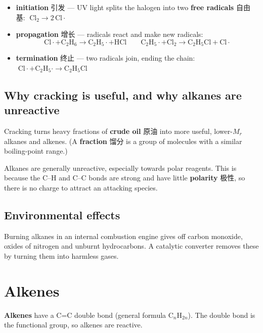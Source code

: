 \documentclass[11pt]{article}
\begin{document}
\begin{itemize}
\item \textbf{initiation} 引发 — UV light splits the halogen into two \textbf{free radicals} 自由基: $\;\text{Cl}_2 \rightarrow 2\,\text{Cl}\cdot$

\item \textbf{propagation} 增长 — radicals react and make new radicals: \[\text{Cl}\cdot + \text{C}_2\text{H}_6 \rightarrow \text{C}_2\text{H}_5\cdot + \text{HCl} \qquad \text{C}_2\text{H}_5\cdot + \text{Cl}_2 \rightarrow \text{C}_2\text{H}_5\text{Cl} + \text{Cl}\cdot\]

\item \textbf{termination} 终止 — two radicals join, ending the chain: $\;\text{Cl}\cdot + \text{C}_2\text{H}_5\cdot \rightarrow \text{C}_2\text{H}_5\text{Cl}$

\end{itemize}

\subsection*{Why cracking is useful, and why alkanes are unreactive}

Cracking turns heavy fractions of \textbf{crude oil} 原油 into more useful, lower-$M_r$ alkanes and alkenes. (A \textbf{fraction} 馏分 is a group of molecules with a similar boiling-point range.)

Alkanes are generally unreactive, especially towards polar reagents. This is because the C–H and C–C bonds are strong and have little \textbf{polarity} 极性, so there is no charge to attract an attacking species.

\subsection*{Environmental effects}

Burning alkanes in an internal combustion engine gives off carbon monoxide, oxides of nitrogen and unburnt hydrocarbons. A catalytic converter removes these by turning them into harmless gases.

\section*{Alkenes}

\textbf{Alkenes} have a C=C double bond (general formula $\text{C}_n\text{H}_{2n}$). The double bond is the functional group, so alkenes are reactive.
\end{document}
